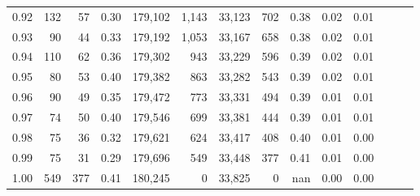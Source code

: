 \begin{tabular}{rrrrrrrrrrrrrr}
0.92 &    132 &   57 &  0.30 &  179,102 &    1,143 &  33,123 &     702 &  0.38 &  0.02 &      0.01 \\
0.93 &     90 &   44 &  0.33 &  179,192 &    1,053 &  33,167 &     658 &  0.38 &  0.02 &      0.01 \\
0.94 &    110 &   62 &  0.36 &  179,302 &      943 &  33,229 &     596 &  0.39 &  0.02 &      0.01 \\
0.95 &     80 &   53 &  0.40 &  179,382 &      863 &  33,282 &     543 &  0.39 &  0.02 &      0.01 \\
0.96 &     90 &   49 &  0.35 &  179,472 &      773 &  33,331 &     494 &  0.39 &  0.01 &      0.01 \\
0.97 &     74 &   50 &  0.40 &  179,546 &      699 &  33,381 &     444 &  0.39 &  0.01 &      0.01 \\
0.98 &     75 &   36 &  0.32 &  179,621 &      624 &  33,417 &     408 &  0.40 &  0.01 &      0.00 \\
0.99 &     75 &   31 &  0.29 &  179,696 &      549 &  33,448 &     377 &  0.41 &  0.01 &      0.00 \\
1.00 &    549 &  377 &  0.41 &  180,245 &        0 &  33,825 &       0 &   nan &  0.00 &      0.00 \\
\bottomrule
\end{tabular}

